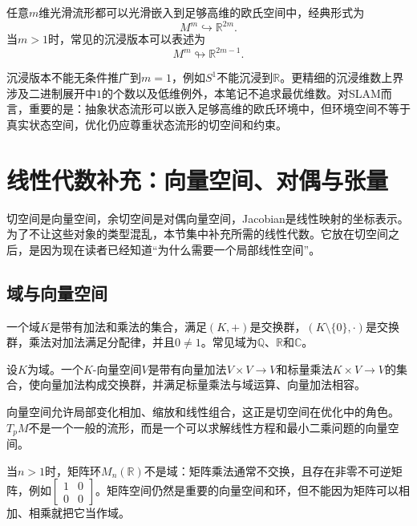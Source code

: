 \begin{proposition}[Whitney嵌入定理的常用形式]
任意$m$维光滑流形都可以光滑嵌入到足够高维的欧氏空间中，经典形式为
\[
    M^m\hookrightarrow\mathbb R^{2m}.
\]
当$m>1$时，常见的沉浸版本可以表述为
\[
    M^m\looparrowright\mathbb R^{2m-1}.
\]
\end{proposition}

沉浸版本不能无条件推广到$m=1$，例如$S^1$不能沉浸到$\mathbb R$。更精细的沉浸维数上界涉及二进制展开中$1$的个数以及低维例外，本笔记不追求最优维数。对SLAM而言，重要的是：抽象状态流形可以嵌入足够高维的欧氏环境中，但环境空间不等于真实状态空间，优化仍应尊重状态流形的切空间和约束。


\section{线性代数补充：向量空间、对偶与张量}

切空间是向量空间，余切空间是对偶向量空间，Jacobian是线性映射的坐标表示。为了不让这些对象的类型混乱，本节集中补充所需的线性代数。它放在切空间之后，是因为现在读者已经知道“为什么需要一个局部线性空间”。

\subsection{域与向量空间}

\begin{definition}[域]
一个域$K$是带有加法和乘法的集合，满足$(K,+)$是交换群，$(K\setminus\{0\},\cdot)$是交换群，乘法对加法满足分配律，并且$0\neq1$。常见域为$\mathbb Q$、$\mathbb R$和$\mathbb C$。
\end{definition}

\begin{definition}[向量空间]
设$K$为域。一个$K$-向量空间$V$是带有向量加法$V\times V\to V$和标量乘法$K\times V\to V$的集合，使向量加法构成交换群，并满足标量乘法与域运算、向量加法相容。
\end{definition}

向量空间允许局部变化相加、缩放和线性组合，这正是切空间在优化中的角色。$T_pM$不是一个一般的流形，而是一个可以求解线性方程和最小二乘问题的向量空间。

\begin{remark}[矩阵空间通常不是域]
当$n>1$时，矩阵环$M_n(\mathbb R)$不是域：矩阵乘法通常不交换，且存在非零不可逆矩阵，例如$\left[\begin{smallmatrix}1&0\\0&0\end{smallmatrix}\right]$。矩阵空间仍然是重要的向量空间和环，但不能因为矩阵可以相加、相乘就把它当作域。
\end{remark}

